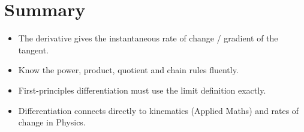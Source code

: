 \documentclass[11pt]{article}
\begin{document}
\section{Summary}

\begin{ldmsummary}
\begin{itemize}
  \item The derivative gives the instantaneous rate of change / gradient of the tangent.
  \item Know the power, product, quotient and chain rules fluently.
  \item First-principles differentiation must use the limit definition exactly.
  \item Differentiation connects directly to kinematics (Applied Maths) and rates of change in Physics.
\end{itemize}
\end{ldmsummary}
\end{document}
